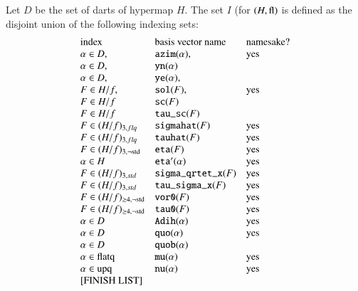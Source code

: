 \begin{definition}
Let $D$ be the set of darts of hypermap $H$.  The set $I$ (for
$(H,{\operatorname{fl}})$ is defined as the disjoint union of the following
indexing sets:
    $$\begin{array}{llll}
        \text{index} &\text{basis vector name}&\text{namesake?}
        \\
        \alpha\in D, &\optt{azim}(\alpha), &\text{yes}
        \\
        \alpha\in D, &\optt{yn} (\alpha)
        \\
        \alpha\in D,
        &\optt{ye} (\alpha),
        \\
        F\in H/f,
        &\optt{sol} (F), &\text{yes}
        \\
        F\in H/f
        &\optt{sc} (F)
        \\
        F\in H/f
        &{\optt{tau\_sc}} (F)
        &\text{ }\\
        F\in (H/f)_{3,flq}
        &\optt{sigmahat} (F)
        &  \text{yes}\\
        F\in (H/f)_{3,flq}
        &\optt{tauhat} (F)
        &\text{yes}\\
        F\in (H/f)_{3,\neg\op{std}}
        &\optt{eta}(F)
        &\text{yes}\\
        \alpha\in H
        &\optt{eta}'(\alpha)
        &\text{yes}\\
        F\in (H/f)_{3,std}
        &\optt{sigma\_qrtet\_x} (F)
        &\text{yes} \\
        F\in (H/f)_{3,std}
        &\optt{tau\_sigma\_x} (F)
        &\text{yes} \\
        F\in (H/f)_{\ge4,\neg\op{std}}
        &\optt{vor0}(F)
        &\text{yes}\\
        F\in (H/f)_{\ge4,\neg\op{std}}
        &\optt{tau0}(F)
        &\text{yes}\\
        \alpha\in D
        &\optt{Adih}(\alpha)
        &\text{yes}\\
        \alpha\in D
        &\optt{quo}(\alpha)
        &\text{yes}\\
        \alpha\in D
        &\optt{quob}(\alpha)
        &\\
        \alpha \in \op{flatq}
        &\optt{mu}(\alpha)
        &\text{yes}\\
        \alpha\in \op{upq}
        &\optt{nu}(\alpha)
        &\text{yes}\\
        \text{[FINISH LIST]} %
    \end{array}
    $$
\end{definition}


